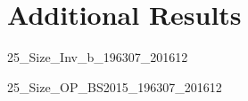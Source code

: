 
\section{Additional Results} \label{sec:addl_results}

{25_Size_Inv_b_196307_201612}




{25_Size_OP_BS2015_196307_201612}

